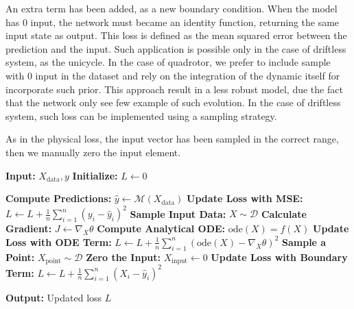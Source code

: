 An extra term has been added, as a new boundary condition. When the model has 0 input, the network must became an identity function, returning the same input state as output. 
This loss is defined as the mean squared error between the prediction and the input. Such application is possible only in the case of driftless system, as the unicycle. 
In the case of quadrotor, we prefer to include sample with 0 input in the dataset and rely on the integration of the dynamic itself for incorporate such prior. 
This approach result in a less robust model, due the fact that the network only see few example of such evolution. In the case of driftless system, such loss can be implemented using a sampling strategy.

As in the physical loss, the input vector has been sampled in the correct range, then we manually zero the input element. 

\begin{algorithm}
    \caption{Training Loop: Loss calculation}
    \begin{algorithmic}[1]
        \State \textbf{Input:} \( X_{\text{data}}, y \)
        \State \textbf{Initialize:} \( L \gets 0 \)
        
        \State \textbf{Compute Predictions:} \( \hat{y} \gets \mathcal{M}(X_{\text{data}}) \)
        \State \textbf{Update Loss with MSE:} \( L \gets L + \frac{1}{n} \sum_{i=1}^{n} (y_i - \hat{y}_i)^2 \)
        \State \textbf{Sample Input Data:} \( X \sim \mathcal{D} \)
        \State \textbf{Calculate Gradient:} \( J \gets \nabla_X \theta \)
        \State \textbf{Compute Analytical ODE:} \( \text{ode}(X) = f(X) \)
        \State \textbf{Update Loss with ODE Term:} \( L \gets L + \frac{1}{n} \sum_{i=1}^{n}(\text{ode}(X) - \nabla_X \theta)^2 \)
        \State \textbf{Sample a Point:} \( X_{\text{point}} \sim \mathcal{D} \)
        \State \textbf{Zero the Input:} \( X_{\text{input}} \gets 0 \)
        \State \textbf{Update Loss with Boundary Term:} \( L \gets L + \frac{1}{n} \sum_{i=1}^{n} (X_i - \hat{y}_i)^2 \)
        
        \State \textbf{Output:} Updated loss \( L \)
    \end{algorithmic}
\end{algorithm}
